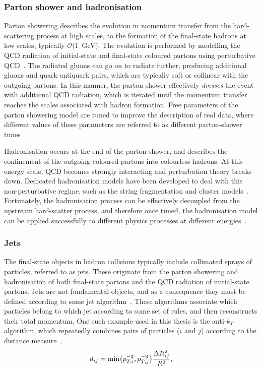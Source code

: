 \subsubsection{Parton shower and hadronisation}
Parton showering describes the evolution in momentum transfer from the hard-scattering process at high scales, to the formation of the final-state hadrons at low scales, typically $\mathcal{O}(1$~GeV). The evolution is performed by modelling the QCD radiation of initial-state and final-state coloured partons using perturbative QCD~\cite{Buckley:2011ms}. The radiated gluons can go on to radiate further, producing additional gluons and quark-antiquark pairs, which are typically soft or collinear with the outgoing partons. In this manner, the parton shower effectively \textit{dresses} the event with additional QCD radiation, which is iterated until the momentum transfer reaches the scales associated with hadron formation. Free parameters of the parton showering model are tuned to improve the description of real data, where different values of these parameters are referred to as different parton-shower tunes~\cite{Khachatryan:2015pea,Sirunyan:2019dfx}.

Hadronisation occurs at the end of the parton shower, and describes the confinement of the outgoing coloured partons into colourless hadrons. At this energy scale, QCD becomes strongly interacting and perturbation theory breaks down. Dedicated hadronisation models have been developed to deal with this non-perturbative regime, such as the string fragmentation and cluster models~\cite{Andersson:1983ia,Andersson:1998tv,Amati:1979fg}. Fortunately, the hadronisation process can be effectively decoupled from the upstream hard-scatter process, and therefore once tuned, the hadronisation model can be applied successfully to different physics processes at different energies~\cite{Buckley:2011ms}.

\subsubsection{Jets}
The final-state objects in hadron collisions typically include collimated sprays of particles, referred to as jets. These originate from the parton showering and hadronisation of both final-state partons and the QCD radiation of initial-state partons. Jets are not fundamental objects, and as a consequence they must be defined according to some jet algorithm~\cite{Salam:2009jx}. These algorithms associate which particles belong to which jet according to some set of rules, and then reconstructs their total momentum. One such example used in this thesis is the anti-$k_T$ algorithm, which repeatedly combines pairs of particles ($i$ and $j$) according to the distance measure~\cite{Cacciari:2008gp},
\begin{equation}\label{eq:antikt_distance}
    d_{ij} = {\rm{min}}\big( p^{-2}_{T,i}, p^{-2}_{T,j} \big) \frac{\Delta R^2_{ij}}{R^2},
\end{equation}

